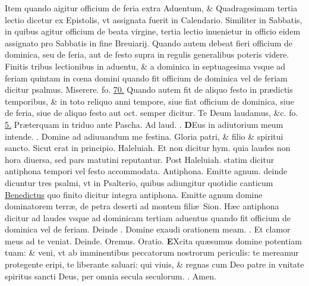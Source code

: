 \documentclass[a5paper,10pt]{book}
\def\ae{æ}
\def\oe{œ}
\begin{document}
\begin{multicols*}{2}
\newline {} \color{red} Item quando aigitur officium de feria extra Aduentum, \& Quadragesimam tertia lectio dicetur ex Epistolis, vt assignata fuerit in Calendario. Similiter in Sabbatis, in quibus agitur officium de beata virgine, tertia lectio inuenietur in officio eidem assignato pro Sabbatis in fine Breuiarij. Quando autem debeat fieri officium de dominica, seu de feria, aut de festo supra in regulis generalibus poteris videre. Finitis tribus lectionibus in aduentu, \& a dominica in septuagesima vsque ad feriam quintam in c\oe na domini quando fit officium de dominica vel de feriam dicitur psalmus. \color{black} Miserere. fo. \hyperlink{ps50}{70.} \color{red} Quando autem fit de aliquo festo in pr\ae dictis temporibus, \& in toto reliquo anni tempore, siue fiat officium de dominica, siue de feria, siue de aliquo festo aut oct. semper dicitur. \color{black} Te Deum laudamus, \&c. fo. \hyperlink{tedeum}{5.} \color{red} Pr\ae terquam in triduo ante Pascha. \hypertarget{DOM-PRIMA-ADV-LAVD}{Ad laud.} \Vbar . \color{black}
\vspace{-.5em}
\lettrine[lines=2]{\bfseries D}{}Eus in adiutorium meum intende. \color{red} \Rbar . \color{black} Domine ad adiuuandum me festina. \color{red} G\color{black}loria patri, \& filio \& spiritui sancto. Sicut erat in principio. Haleluiah.
\newline \color{red} Et non dicitur hym. quia laudes non hora diuersa, sed pars matutini reputantur. Post \color{black} Haleluiah. \color{red} statim dicitur antiphona tempori vel festo accommodata. Antiphona. \color{black} Emitte agnum. \color{red} deinde dicuntur tres psalmi, vt in Psalterio, quibus adiungitur quotidie canticum \color{black} \hyperlink{Benedictus}{Benedictus} \color{red} quo finito dicitur integra antiphona. \color{black} Emitte agnum domine dominatorem terr\ae , de petra deserti ad montem fili\ae \ Sion. \color{red} H\ae c antiphona dicitur ad laudes vsque ad dominicam tertiam aduentus quando fit officium de dominica vel de feriam. Deinde \Vbar . \color{black} Domine exaudi orationem meam. \color{red} \Rbar . \color{black} Et clamor meus ad te veniat. \color{red} Deinde. \color{black} Oremus. \color{red} Oratio. \color{black}
\vspace{-.5em}
\lettrine[lines=2]{\bfseries \color{red} E}{}Xcita qu\ae sumus domine potentiam tuam: \& veni, vt ab imminentibus peccatorum nostrorum periculis: te mereamur protegente eripi, te liberante saluari: qui viuis, \& regnas cum Deo patre in vnitate spiritus sancti Deus, per omnia secula seculorum. \color{red} \Rbar . \color{black} Amen.

\end{multicols*}
\end{document}
